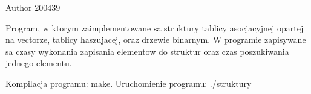 \begin{DoxyAuthor}{\-Author}
200439
\end{DoxyAuthor}
\-Program, w ktorym zaimplementowane sa struktury tablicy asocjacyjnej opartej na vectorze, tablicy haszujacej, oraz drzewie binarnym. \-W programie zapisywane sa czasy wykonania zapisania elementow do struktur oraz czas poszukiwania jednego elementu.

\-Kompilacja programu\-: make. \-Uruchomienie programu\-: ./struktury 